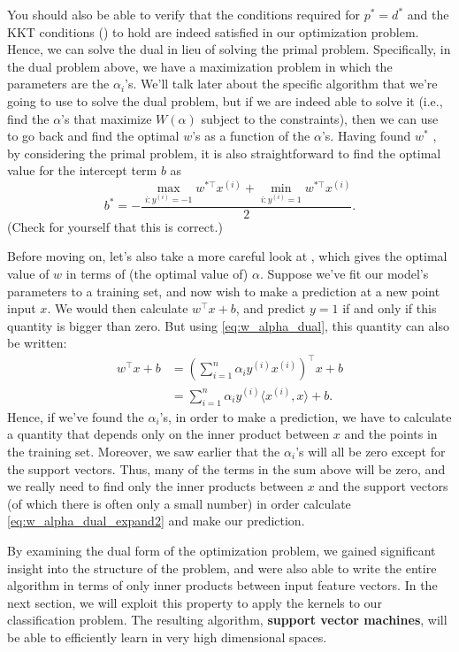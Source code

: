 You should also be able to verify that the conditions required for $p^* = d^*$
and the KKT conditions () to hold are indeed satisfied in
our optimization problem. Hence, we can solve the dual in lieu of solving
the primal problem. Specifically, in the dual problem above, we have a
maximization problem in which the parameters are the $\alpha_i$'s. We'll talk later
about the specific algorithm that we're going to use to solve the dual problem,
but if we are indeed able to solve it (i.e., find the $\alpha$'s that maximize $W(\alpha)$
subject to the constraints), then we can use  to go back and
find the optimal $w$'s as a function of the $\alpha$'s. Having found $w^*$ , by considering
the primal problem, it is also straightforward to find the optimal value for
the intercept term $b$ as
\begin{equation}
    b^* = -\frac{\max_{i:y^{(i)} = -1} w^{*\top} x^{(i)} + \min_{i:y^{(i)} =1} w^{*\top}x^{(i)}}{2}\label{eq:b_optimal}.
\end{equation}
(Check for yourself that this is correct.)

Before moving on, let's also take a more careful look at ,
which gives the optimal value of $w$ in terms of (the optimal value of) $\alpha$.
Suppose we've fit our model's parameters to a training set, and now wish to
make a prediction at a new point input $x$. We would then calculate $w^\top x+b$,
and predict $y = 1$ if and only if this quantity is bigger than zero. But
using \cref{eq:w_alpha_dual}, this quantity can also be written:
\begin{align}
    w^\top x + b &= \left( \sum_{i=1}^n \alpha_i y^{(i)} x^{(i)} \right)^\top x + b\label{eq:w_alpha_dual_expand1}\\
    &= \sum_{i=1}^n \alpha_i y^{(i)} \langle x^{(i)} ,x \rangle + b\label{eq:w_alpha_dual_expand2}.
\end{align}
Hence, if we've found the $\alpha_i$'s, in order to make a prediction, we have to
calculate a quantity that depends only on the inner product between $x$ and
the points in the training set. Moreover, we saw earlier that the $\alpha_i$'s will all
be zero except for the support vectors. Thus, many of the terms in the sum
above will be zero, and we really need to find only the inner products between
$x$ and the support vectors (of which there is often only a small number) in
order calculate \cref{eq:w_alpha_dual_expand2} and make our prediction.

By examining the dual form of the optimization problem, we gained significant
insight into the structure of the problem, and were also able to write
the entire algorithm in terms of only inner products between input feature
vectors. In the next section, we will exploit this property to apply the kernels
to our classification problem. The resulting algorithm, \textbf{support vector
machines}, will be able to efficiently learn in very high dimensional spaces.

